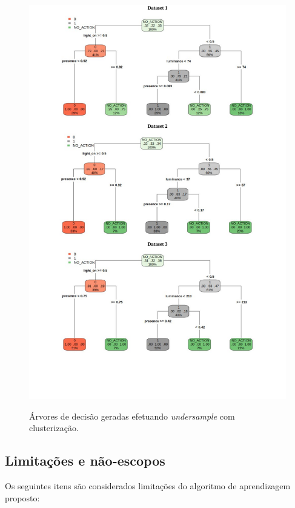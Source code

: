 \begin{figure}[hp]
	\centering
	\caption{Árvores de decisão geradas efetuando \textit{undersample} com clusterização.}
  \includegraphics[width=\textwidth]{imagens/teste_learning/6.pdf}
  \label{fig:teste_6}  
\end{figure}

\clearpage


\subsection{Limitações e não-escopos} \label{subsec:limit_aprendizgem}
Os seguintes itens são considerados limitações do algoritmo de aprendizagem proposto:

